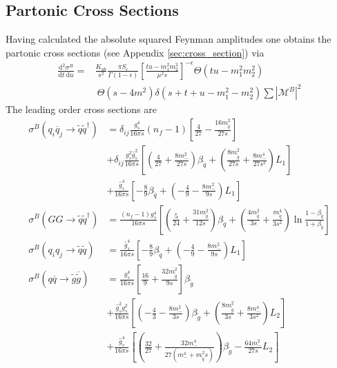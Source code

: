 \subsection{Partonic Cross Sections}
Having calculated the absolute squared Feynman amplitudes one obtains the partonic cross sections (see Appendix \ref{sec:cross_section}) via
\begin{align}
\frac{\mbox{d}^2 \sigma^B}{\mbox{d}t\ \mbox{d}u} =& \frac{K_{ab}}{s^2} \frac{\pi S_{\epsilon}}{\Gamma(1-\epsilon)} \left[ \frac{tu-m_1^2m_2^2}{\mu^2 s}\right]^{-\epsilon} \Theta(tu-m_1^2m_2^2)\nonumber\\
&\ \Theta(s-4m^2) \delta(s+t+u-m_1^2-m_2^2) \sum |\mathcal{M}^B|^2
\end{align}
The leading order cross sections are
\begin{align}
\sigma^B(q_i \overline{q}_j \to \tilde{q}\tilde{q}^\dagger) &= \delta_{ij}  \frac{g_s^4}{16\pi s} (n_f-1) \left[ \frac{4}{27} - \frac{16 m_{\tilde{q}}^2}{27s} \right]\nonumber\\
&+ \delta_{ij} \frac{g_s^2\hat{g}_s^2}{16\pi s}  \left[ \left( \frac{4}{27} + \frac{8 m_-^2}{27 s} \right)\beta_{\tilde{q}}  + \left( \frac{8m_{\tilde{g}}^2}{27s} + \frac{8m_-^4}{27s^2} \right)L_1 \right]\nonumber\\
& + \frac{\hat{g}_s^4}{16\pi s} \left[ -\frac{8}{9}\beta_{\tilde{q}} + \left( -\frac{4}{9} - \frac{8m_-^2}{9s} \right)L_1 \right]\\
\sigma^B(GG \to \tilde{q}\tilde{q}^\dagger) &= \frac{(n_f-1) g_s^4}{16\pi s} \left[ \left(\frac{5}{24} + \frac{31 m_{\tilde{q}}^2}{12s}\right)\beta_{\tilde{q}} + \left( \frac{4m_{\tilde{q}}^2}{3s} + \frac{m_{\tilde{q}}^4}{3s^2} \right) \ln \frac{1-\beta_{\tilde{q}}}{1+\beta_{\tilde{q}}} \right]\\
\sigma^B(q_i q_j \to \tilde{q}\tilde{q}) &= \frac{\hat{g}_s^4}{16\pi s} \left[ -\frac{8}{9}\beta_{\tilde{q}} +  \left( -\frac{4}{9} - \frac{8m_-^2}{9s} \right)L_1 \right]\\
\sigma^B(q \overline{q} \to \tilde{g}\overline{\tilde{g}}) &= \frac{g_s^4}{16\pi s} \left[ \frac{16}{9} + \frac{32m_{\tilde{g}}^2}{9s} \right] \beta_{\tilde{g}}\nonumber\\
& + \frac{\hat{g}_s^2 g_s^2}{16\pi s}  \left[ \left( -\frac{4}{3}-\frac{8m_-^2}{3s} \right)\beta_{\tilde{g}} + \left( \frac{8 m_{\tilde{g}}^2}{3s} + \frac{8m_-^4}{3s^2} \right) L_2 \right]\nonumber\\
& + \frac{\hat{g}_s^4}{16\pi s} \left[ \left( \frac{32}{27} + \frac{32 m_-^4}{27(m_-^4 + m_{\tilde{q}}^2s)} \right)\beta_{\tilde{g}} - \frac{64m_-^2}{27s}L_2 \right]\label{eq:qqbar_to_sgsgbar}\\

\end{align}
